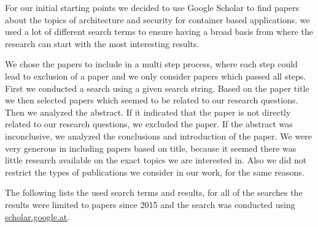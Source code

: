 \documentclass[conference]{IEEEtran}
\begin{document}
For our initial starting points we decided to use Google Scholar to find papers about the topics of architecture and security for container based applications. we used a lot of different search terms to ensure having a broad basis from where the research can start with the most interesting results.

We chose the papers to include in a multi step process, where each step could lead to exclusion of a paper and we only consider papers which passed all steps.
First we conducted a search using a given search string. Based on the paper title we then selected papers which seemed to be related to our research questions. Then we analyzed the abstract. If it indicated that the paper is not directly related to our research questions, we excluded the paper. If the abstract was inconclusive, we analyzed the conclusions and introduction of the paper.
We were very generous in including papers based on title, because it seemed there was little research available on the exact topics we are interested in. Also we did not restrict the types of publications we consider in our work, for the same reasons.

The following lists the used search terms and results, for all of the searches the results were limited to papers since 2015 and the search was conducted using \url{scholar.google.at}.
\end{document}
